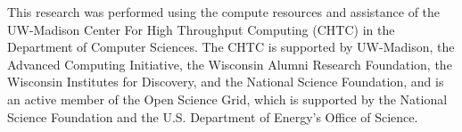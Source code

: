 \documentclass[10pt,conference]{IEEEtran}
\begin{document}
This research was performed using the compute resources and assistance of the UW-Madison Center For High Throughput Computing (CHTC) in the Department of Computer Sciences. The CHTC is supported by UW-Madison, the Advanced Computing Initiative, the Wisconsin Alumni Research Foundation, the Wisconsin Institutes for Discovery, and the National Science Foundation, and is an active member of the Open Science Grid, which is supported by the National Science Foundation and the U.S. Department of Energy's Office of Science.


\clearpage

\newpage



\clearpage
% 


\end{document}
